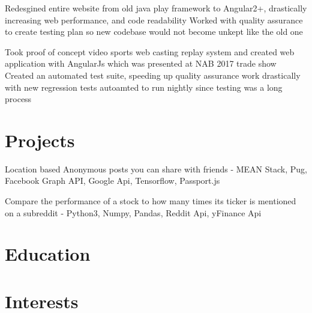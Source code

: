 \documentclass{my_resume}
\begin{document}
\workitemstwo
{Redesgined entire website from old java play framework to Angular2+, drastically increasing web performance, and code readability}
{Worked with quality assurance to create testing plan so new codebase would not become unkept like the old one}

\workitemstwo
{Took proof of concept video sports web casting replay system and created web application with AngularJs
 which was presented at NAB 2017 trade show}
{Created an automated test suite, speeding up quality assurance work drastically with new regression tests
 autoamted to run nightly since testing was a long process}

\section{Projects}

\projectitem
{Location based Anonymous posts you can share with friends - MEAN Stack, Pug, Facebook Graph API, Google Api, Tensorflow, Passport.js }

\projectitem
{Compare the performance of a stock to how many times its ticker is mentioned on a subreddit - Python3, Numpy, Pandas, Reddit Api, yFinance Api}

\section{Education}

\section{Interests}
\end{document}
